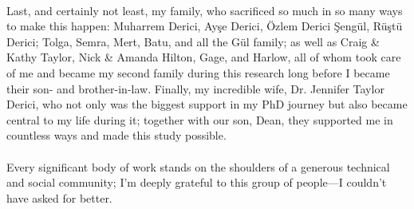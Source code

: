 \paragraph{}%
Last, and certainly not least, my family, who sacrificed so much in so many ways to make this happen: Muharrem Derici, Ayşe Derici, Özlem Derici Şengül, Rüştü Derici; Tolga, Semra, Mert, Batu, and all the Gül family; as well as Craig \& Kathy Taylor, Nick \& Amanda Hilton, Gage, and Harlow, all of whom took care of me and became my second family during this research long before I became their son- and brother-in-law. Finally, my incredible wife, Dr. Jennifer Taylor Derici, who not only was the biggest support in my PhD journey but also became central to my life during it; together with our son, Dean, they supported me in countless ways and made this study possible.

\paragraph{}%
Every significant body of work stands on the shoulders of a generous technical and social community; I'm deeply grateful to this group of people---I couldn't have asked for better.

